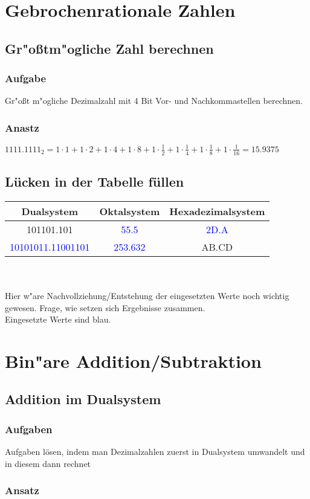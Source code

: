 \documentclass[a4paper,11pt,titlepage]{article}
\begin{document}
\section{Gebrochenrationale Zahlen}
\subsection{Gr"oßtm"ogliche Zahl berechnen}
\subsubsection{Aufgabe}
Gr"oßt m"ogliche Dezimalzahl mit 4 Bit Vor- und Nachkommastellen berechnen.
\subsubsection{Anastz}
$1111.1111_2 =  1\cdot 1 + 1\cdot 2 + 1\cdot 4 +1\cdot 8 + 1\cdot\frac{1}{2} + 
1\cdot\frac{1}{4} + 1\cdot\frac{1}{8}+1\cdot\frac{1}{16} = 15.9375$
\subsection{Lücken in der Tabelle füllen}
\begin{tabular}{|c|c|c|}
\hline
Dualsystem&Oktalsystem&Hexadezimalsystem\\
\hline
101101.101&\textcolor{blue}{55.5}&\textcolor{blue}{2D.A}\\
\hline
\textcolor{blue}{10101011.11001101}&\textcolor{blue}{253.632}&AB.CD\\
\hline
\end{tabular}\\
\\
Hier w"are Nachvollziehung/Entstehung der eingesetzten Werte noch wichtig gewesen. Frage, wie setzen sich Ergebnisse zusammen.
\\
Eingesetzte Werte sind blau.
\section{Bin"are Addition/Subtraktion}
\subsection{Addition im Dualsystem}
\subsubsection{Aufgaben}
Aufgaben lösen, indem man Dezimalzahlen zuerst in Dualsystem umwandelt und in diesem dann rechnet
\subsubsection{Ansatz}
\end{document}
